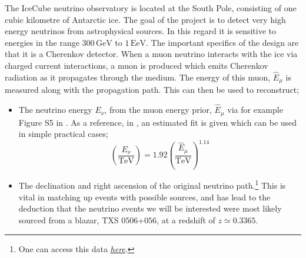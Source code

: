 \documentclass[11pt]{article}
\numberwithin{equation}{section}
\numberwithin{figure}{section}
\numberwithin{table}{section}
\begin{document}
The IceCube neutrino observatory \cite{IceCube} is located at the South Pole, consisting of one cubic kilometre of Antarctic ice. The goal of the project is to detect very high energy neutrinos from astrophysical sources. In this regard it is sensitive to energies in the range $300\,\text{GeV}$ to $1\,\text{EeV}$. The important specifics of the design are that it is a Cherenkov detector. When a muon neutrino interacts with the ice via charged current interactions, a muon is produced which emits Cherenkov radiation as it propagates through the medium. The energy of this muon, $\hat{E}_\mu$ is measured along with the propagation path. This can then be used to reconstruct;
\begin{itemize}
  \item The neutrino energy $E_\nu$, from the muon energy prior, $\hat{E}_\mu$ via for example Figure S5 in \cite{IceCube2018}. As a reference, in \cite{Kelly}, an estimated fit is given which can be used in simple practical cases;
  \begin{equation}
    \left(\frac{E_\nu}{\textrm{TeV}}\right) = 1.92\left(\frac{\hat{E}_\mu}{\textrm{TeV}}\right)^{1.14}
  \end{equation}
  \item The declination and right ascension of the original neutrino path.\footnote{One can access this data \href{https://icecube.wisc.edu/science/data/access}{\textit{here}}.} This is vital in matching up events with possible sources, and has lead to the deduction that the neutrino events we will be interested were most likely sourced from a blazar, TXS $0506$+$056$, at a redshift of $z \simeq 0.3365$.
\end{itemize}
\end{document}
